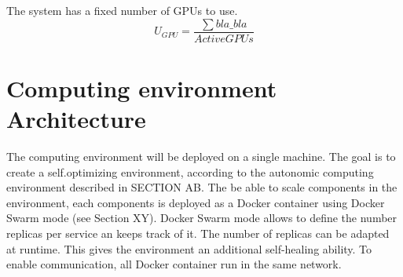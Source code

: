 The system has a fixed number of GPUs to use.
\begin{equation}
U_{GPU} = \dfrac{\sum bla\_bla}{ActiveGPUs}
\label{eq:formel}
\end{equation}


\section{Computing environment Architecture}


The computing environment will be deployed on a single machine.
The goal is to create a self.optimizing environment, according to the autonomic computing environment described in SECTION AB.
The be able to scale components in the environment, each components is deployed as a Docker container using Docker Swarm mode (see Section XY). Docker Swarm mode allows to define the number replicas per service an keeps track of it. The number of replicas can be adapted at runtime. This gives the environment an additional self-healing ability.
To enable communication, all Docker container run in the same network.

